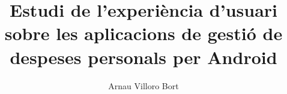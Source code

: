 \documentclass{book}
\title{Estudi de l'experiència d'usuari sobre les aplicacions de gestió de despeses personals per Android}
\author{Arnau Villoro Bort}
\begin{document}
\newcommand{\blueA}{\cellcolor{blue_table_1}}
\newcommand{\blueB}{\cellcolor{blue_table_2}}
\newcommand{\blueC}{\cellcolor{blue_table_3}}
\newcommand{\headA}[1]{\multicolumn{1}{|c|}{\blueA \textbf{#1}}}
\newcommand{\headB}[1]{\multicolumn{1}{|c|}{\blueB \textbf{#1}}}
\newcommand{\headC}[1]{\multicolumn{1}{|c|}{\blueC \textbf{#1}}}
\newcommand{\noBorde}[1]{\multicolumn{1}{#1}{}}


\frontmatter






\tableofcontents
{}
\listoffigures
{}
\listoftables
{}






\mainmatter














\end{document}
